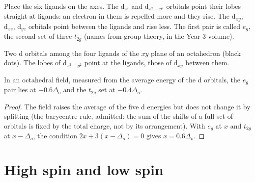 Place the six ligands on the axes. The $\mathrm d_{z^2}$ and $\mathrm d_{x^2-y^2}$
orbitals point their lobes straight at ligands: an electron in them is repelled more
and they rise. The $\mathrm d_{xy}$, $\mathrm d_{xz}$, $\mathrm d_{yz}$ orbitals point between
the ligands and rise less. The first pair is called $e_g$, the second set of three
$t_{2g}$ (names from group theory, in the Year 3 volume).

\begin{omfigure}

{\small Two d orbitals among the four ligands of the $xy$ plane of an octahedron
(black dots). The lobes of $\mathrm d_{x^2-y^2}$ point at the ligands, those of
$\mathrm d_{xy}$ between them.}
\end{omfigure}

\begin{theorem}[Barycentre]\label{thm:b2:ligand-field:barycentre}
In an octahedral field, measured from the average energy of the d orbitals, the
$e_g$ pair lies at $+0.6\Delta_o$ and the $t_{2g}$ set at $-0.4\Delta_o$.
\end{theorem}

\begin{proof}
The field raises the average of the five d energies but does not change it by
splitting (the barycentre rule, admitted: the sum of the shifts of a full set of
orbitals is fixed by the total charge, not by its arrangement). With $e_g$ at $x$ and
$t_{2g}$ at $x - \Delta_o$, the condition $2x + 3(x - \Delta_o) = 0$ gives $x = 0.6\Delta_o$.
\end{proof}

\section{High spin and low spin}


